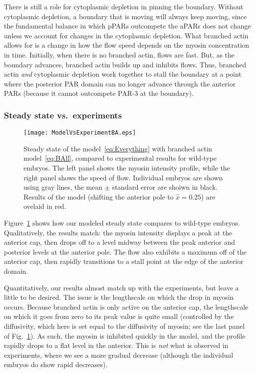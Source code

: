 \documentclass[11pt]{article}
\newcommand{\red}[1]{\color{red}#1\normalcolor}
\newcommand{\6}[1]{#1_{\text{6}}}
\newcommand{\3}[1]{#1_{\text{3}}}
\begin{document}
There is still a role for cytoplasmic depletion in pinning the boundary. Without cytoplasmic depletion, a boundary that is moving will always keep moving, since the fundamental balance in which pPARs outcompete the aPARs does not change unless we account for changes in the cytoplasmic depletion. What branched actin allows for is a change in how the flow speed depends on the myosin concentration in time. Initially, when there is no branched actin, flows are fast. But, as the boundary advances, branched actin builds up and inhibits flows. Thus, branched actin \emph{and} cytoplasmic depletion work together to stall the boundary at a point where the posterior PAR domain can no longer advance through the anterior PARs (because it cannot outcompete PAR-3 at the boundary). 


\subsubsection{Steady state vs.\ experiments}

\begin{figure}
\centering
\texttt{[image: ModelVsExperimentBA.eps]}
\caption{\label{fig:StStBA}Steady state of the model\ \eqref{eq:Everything} with branched actin model\ \eqref{eq:BAll}, compared to experimental results for wild-type embryos. The left panel shows the myosin intensity profile, while the right panel shows the speed of flow. Individual embryos are shown using gray lines, the mean $\pm$ standard error are shoiwn in black. Results of the model (shifting the anterior pole to $\hat x = 0.25$) are ovelaid in red.}
\end{figure}

Figure\ \ref{fig:StStBA} shows how our modeled steady state compares to wild-type embryos. Qualitatively, the results match: the myosin intensity displays a peak at the anterior cap, then drops off to a level midway between the peak anterior and posterior levels at the anterior pole. The flow also exhibits a maximum off of the anterior cap, then rapidly transitions to a stall point at the edge of the anterior domain.

\red{Quantitatively, our results almost match up with the experiments, but leave a little to be desired. The issue is the lengthscale on which the drop in myosin occurs. Because branched actin is only active on the anterior cap, the lengthscale on which it goes from zero to its peak value is quite small (controlled by the diffusivity, which here is set equal to the diffusivity of myosin; see the last panel of Fig.\ \ref{fig:StStBA}). As such, the myosin is inhibited quickly in the model, and the profile rapidly drops to a flat level in the anterior. This is \emph{not} what is observed in experiments, where we see a more gradual decrease (although the individual embryos do show rapid decreases).}




\end{document}
